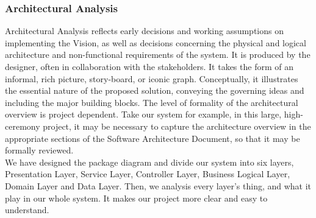 \documentclass[12pt]{scrreprt}
\begin{document}
\subsubsection{Architectural Analysis}
Architectural Analysis reflects early decisions and working assumptions on implementing the Vision, as well as decisions concerning the physical and logical architecture and non-functional requirements of the system. It is produced by the designer, often in collaboration with the stakeholders. It takes the form of an informal, rich picture, story-board, or iconic graph. Conceptually, it illustrates the essential nature of the proposed solution, conveying the governing ideas and including the major building blocks. The level of formality of the architectural overview is project dependent. Take our system for example, in this large, high-ceremony project, it may be necessary to capture the architecture overview in the appropriate sections of the Software Architecture Document, so that it may be formally reviewed.\\
We have designed the package diagram and divide our system into six layers, Presentation Layer, Service Layer, Controller Layer, Business Logical Layer, Domain Layer and Data Layer. Then, we analysis every layer's thing, and what it play in our whole system. It makes our project more clear and easy to understand.
\end{document}
